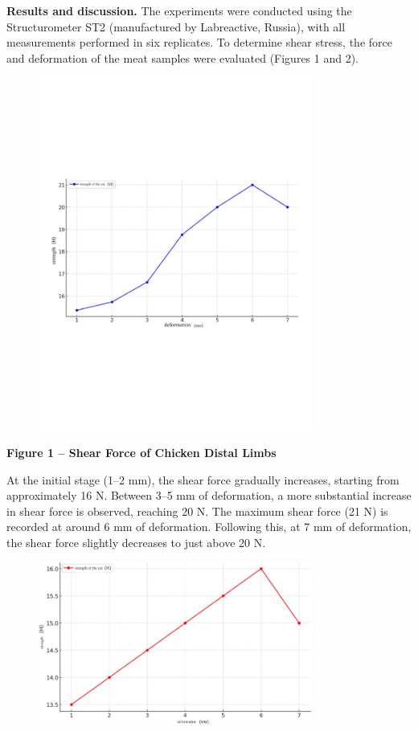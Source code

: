 {\bfseries Results and discussion.} The experiments were conducted using
the Structurometer ST2 (manufactured by Labreactive, Russia), with all
measurements performed in six replicates. To determine shear stress, the
force and deformation of the meat samples were evaluated (Figures 1 and
2).

\begin{figure}[H]
	\centering
	\includegraphics[width=0.8\textwidth]{media/pish/image9}
	\caption*{}
\end{figure}


{\bfseries Figure 1 -- Shear Force of Chicken Distal Limbs}

At the initial stage (1--2 mm), the shear force gradually increases,
starting from approximately 16 N. Between 3--5 mm of deformation, a more
substantial increase in shear force is observed, reaching 20 N. The
maximum shear force (21 N) is recorded at around 6 mm of deformation.
Following this, at 7 mm of deformation, the shear force slightly
decreases to just above 20 N.

\begin{figure}[H]
	\centering
	\includegraphics[width=0.8\textwidth]{media/pish/image16}
	\caption*{}
\end{figure}


